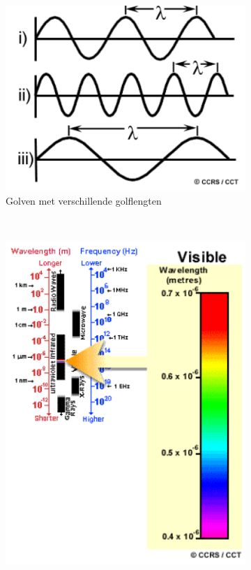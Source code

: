 \documentclass[12pt]{report}
\newcommand{\rulesep}{\unskip\ \vrule height -1ex\ }
\begin{document}
\begin{figure}
\center
\begin{subfigure}[b]{0.3\textwidth}
\includegraphics[width=\textwidth]{golflengte.PNG}
\caption{Golven met verschillende golflengten \label{fig:golflengte}}
\end{subfigure} \rulesep
\begin{subfigure}[b]{0.2\textwidth}
\includegraphics[width=\textwidth]{spec.PNG}

\end{subfigure}
\end{figure}
\end{document}
